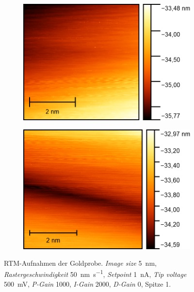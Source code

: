 \begin{figure}[H]
    \centering
    \begin{subfigure}{0.45\textwidth}
        \centering
        \includegraphics[width=\linewidth]{../figs/Gold10494}
        \caption{}
    \end{subfigure}
    \begin{subfigure}{0.45\textwidth}
        \centering
        \includegraphics[width=\linewidth]{../figs/Gold10495}
        \caption{}
    \end{subfigure}
    \caption{RTM-Aufnahmen der Goldprobe. \textit{Image size} \SI{5}{\nano \meter}, \textit{Rastergeschwindigkeit} \SI{50}{\nano\meter \per \second}, \textit{Setpoint} \SI{1}{\nano \ampere},
    \textit{Tip voltage} \SI{500}{\milli \volt}, \textit{P-Gain} \num{1000}, \textit{I-Gain} \num{2000}, \textit{D-Gain} \num{0}, Spitze 1.}\label{fig:gold6}
\end{figure}